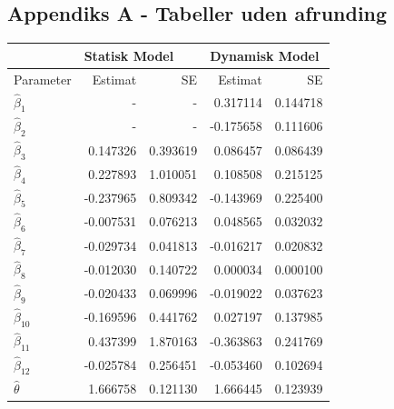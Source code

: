 \documentclass[11pt,a4paper]{article}
\begin{document}
\subsection{Appendiks A - Tabeller uden afrunding}
\begin{table}[ht]
\centering
\begin{adjustbox}{max width=\textwidth}
\begin{tabular}{|l|rr|rr|}
\hline
\multicolumn{1}{|l|}{} & \multicolumn{2}{l|}{Statisk Model} & \multicolumn{2}{l|}{Dynamisk Model} \\
\hline
Parameter & Estimat & SE & Estimat & SE \\
  \hline
    $\hat{\beta}_1$ & - & - & 0.317114 & 0.144718\\
    $\hat{\beta}_2$ & - & - & -0.175658 & 0.111606\\
    $\hat{\beta}_3$ & 0.147326 & 0.393619 & 0.086457 & 0.086439\\
    $\hat{\beta}_4$ & 0.227893 & 1.010051 & 0.108508 & 0.215125\\
    $\hat{\beta}_5$ & -0.237965 & 0.809342 & -0.143969 & 0.225400\\
    $\hat{\beta}_6$ & -0.007531 & 0.076213 & 0.048565 & 0.032032\\
    $\hat{\beta}_7$ & -0.029734 & 0.041813 & -0.016217 & 0.020832\\
    $\hat{\beta}_8$ & -0.012030 & 0.140722 & 0.000034 & 0.000100\\
    $\hat{\beta}_9$ & -0.020433 & 0.069996 & -0.019022 & 0.037623\\
    $\hat{\beta}_{10}$ & -0.169596 & 0.441762 & 0.027197 & 0.137985\\
    $\hat{\beta}_{11}$ & 0.437399 & 1.870163 & -0.363863 & 0.241769\\
    $\hat{\beta}_{12}$ & -0.025784 & 0.256451 & -0.053460 & 0.102694\\
    $\hat{\theta}$ & 1.666758 & 0.121130 & 1.666445 & 0.123939\\
   \hline
\end{tabular}
\end{adjustbox}
\end{table}
\printbibliography %
\end{document}
